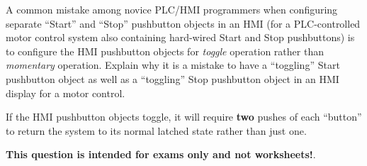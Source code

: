 

A common mistake among novice PLC/HMI programmers when configuring separate ``Start'' and ``Stop'' pushbutton objects in an HMI (for a PLC-controlled motor control system also containing hard-wired Start and Stop pushbuttons) is to configure the HMI pushbutton objects for {\it toggle} operation rather than {\it momentary} operation.   Explain why it is a mistake to have a ``toggling'' Start pushbutton object as well as a ``toggling'' Stop pushbutton object in an HMI display for a motor control.







If the HMI pushbutton objects toggle, it will require {\bf two} pushes of each ``button'' to return the system to its normal latched state rather than just one.







{\bf This question is intended for exams only and not worksheets!}.


